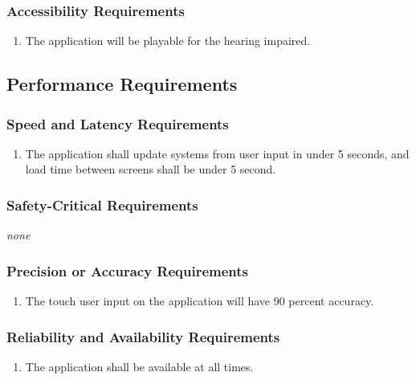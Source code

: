 \documentclass[12pt, titlepage]{article}
\begin{document}
\subsubsection{Accessibility Requirements}
\label{ssub:accessibility_requirements}
\begin{enumerate}[{UH}4. ]
	\item The application will be playable for the hearing impaired.
\end{enumerate}


\subsection{Performance Requirements}
\label{sub:performance_requirements}

\subsubsection{Speed and Latency Requirements}
\label{ssub:speed_and_latency_requirements}
\begin{enumerate}[{PR}1. ]
	\item The application shall update systems from user input in under 5 seconds, and load time between screens shall be under 5 second.
\end{enumerate}

\subsubsection{Safety-Critical Requirements}
\label{ssub:safety_critical_requirements}
\emph{none}

\subsubsection{Precision or Accuracy Requirements}
\label{ssub:precision_or_accuracy_requirements}
\begin{enumerate}[{PR}2. ]
	\item The touch user input on the application will have 90 percent accuracy.
\end{enumerate}

\subsubsection{Reliability and Availability Requirements}
\label{ssub:reliability_and_availability_requirements}
\begin{enumerate}[{PR}1. ]
	\item The application shall be available at all times.
\end{enumerate}
\end{document}
